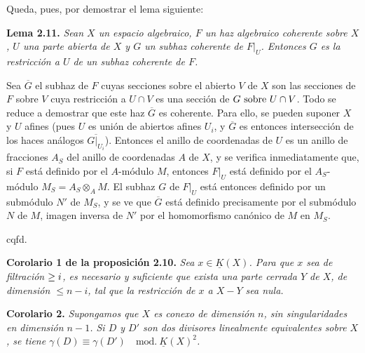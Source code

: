 Queda, pues, por demostrar el lema siguiente:

\textbf{Lema 2.11.} \emph{Sean $X$ un espacio algebraico, $F$ un haz algebraico coherente sobre $X$, $U$ una parte abierta de $X$ y $G$ un subhaz coherente de $F|_U$. Entonces $G$ es la restricción a $U$ de un subhaz coherente de $F$.}

Sea $\overline G$ el subhaz de $F$ cuyas secciones sobre el abierto $V$ de $X$ son las secciones de $F$ sobre $V$ cuya restricción a $U\cap V$ es una sección de $\sisi{V}{G\text{ sobre }U\cap V}$. Todo se reduce a demostrar que este haz $\overline G$ es coherente. Para ello, se pueden suponer $X$ y $U$ afines (pues $U$ es unión de abiertos afines $U_i$, y $\overline G$ es entonces intersección de los haces análogos $\overline{G|_{U_i}}$). Entonces el anillo de coordenadas de $U$ es un anillo de fracciones $A_S$ del anillo de coordenadas $A$ de $X$, y se verifica inmediatamente que, si $F$ está definido por el $A$-módulo $M$, entonces $F|_U$ está definido por el $A_S$-módulo $M_S=A_S\otimes_A M$. El subhaz $G$ de $F|_U$ está entonces definido por un submódulo $N'$ de $M_S$, y se ve que $\overline G$ está definido precisamente por el submódulo $N$ de $M$, imagen inversa de $N'$ por el homomorfismo canónico de $M$ en $M_S$.
\begin{flushright}cqfd.\end{flushright}

\textbf{Corolario 1 de la proposición 2.10.} \emph{Sea $x\in\underline K(X)$. Para que $x$ sea de filtración $\sisi{\leq}{\geq} i$, es necesario y suficiente que exista una parte cerrada $Y$ de $X$, de dimensión $\leq n-i$, tal que la restricción de $x$ a $X-Y$ sea nula.}

\textbf{Corolario 2.} \emph{Supongamos que $X$ es conexo de dimensión $n$, sin singularidades en dimensión $n-1$. Si $D$ y $D'$ son dos divisores linealmente equivalentes sobre $X$, se tiene $\gamma(D)\equiv\gamma(D')\quad\mathrm{mod.}\ \underline K(X)^2$.}

